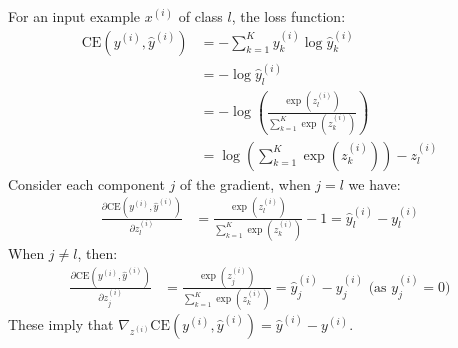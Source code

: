\begin{answer}
For an input example $x^{(i)}$ of class $l$, the loss function:
\begin{align}
	\text{CE}(y^{(i)}, \hat{y}^{(i)}) 
	&= - \sum \limits_{k=1}^{K} y^{(i)}_{k} \log\hat{y}^{(i)}_{k} \\
	&= - \log\hat{y}^{(i)}_{l} \\
	&= - \log \left( \frac{\exp(z^{(i)}_l)}{\sum_{k=1}^K \exp(z^{(i)}_k)} \right) \\
	&= \log \left( \sum_{k=1}^K \exp(z^{(i)}_k) \right) - z^{(i)}_l
\end{align}
Consider each component $j$ of the gradient, when $j = l$ we have:
\begin{align}
	\frac{\partial \text{CE}(y^{(i)}, \hat{y}^{(i)})}{\partial z^{(i)}_l} 
	&= \frac{\exp(z^{(i)}_l)}{\sum_{k=1}^K \exp(z^{(i)}_k)} - 1
	= \hat{y}^{(i)}_l - y^{(i)}_l
\end{align}
When $j \ne l$, then:
\begin{align}
	\frac{\partial \text{CE}(y^{(i)}, \hat{y}^{(i)})}{\partial z^{(i)}_j}
	&= \frac{\exp(z^{(i)}_j)}{\sum_{k=1}^K \exp(z^{(i)}_k)}
	= \hat{y}^{(i)}_j - y^{(i)}_j \text{ (as $y^{(i)}_j = 0$)}
\end{align}
These imply that $\nabla_{z^{(i)}} \mathrm{CE}(y^{(i)}, \hat{y}^{(i)}) = \hat{y}^{(i)} - y^{(i)}$. \\
\end{answer}
   
  
